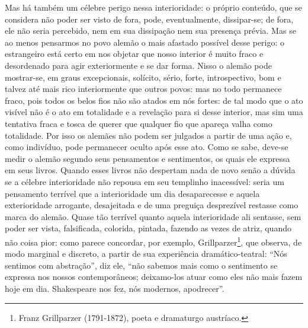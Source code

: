\begin{enumerate}
    Mas há também um célebre perigo nessa interioridade: o próprio
    conteúdo, que se considera não poder ser visto de fora, pode,
    eventualmente, dissipar-se; de fora, ele não seria percebido, nem em
    sua dissipação nem sua presença prévia. Mas se ao menos pensarmos no
    povo alemão o mais afastado possível desse perigo: o estrangeiro
    está certo em nos objetar que nosso interior é muito fraco e
    desordenado para agir exteriormente e se dar forma. Nisso o alemão
    pode mostrar-se, em graus excepcionais, solícito, sério, forte,
    introspectivo, bom e talvez até mais rico interiormente que outros
    povos: mas no todo permanece fraco, pois todos os belos fios não são
    atados em nós fortes: de tal modo que o ato visível não é o ato em
    totalidade e a revelação para si desse interior, mas sim uma
    tentativa fraca e tosca de querer que qualquer fio que apareça valha
    como totalidade. Por isso os alemães não podem ser julgados a partir
    de uma ação e, como indivíduo, pode permanecer oculto após esse ato.
    Como se sabe, deve-se medir o alemão segundo seus pensamentos e
    sentimentos, os quais ele expressa em seus livros. Quando esses
    livros não despertam nada de novo senão a dúvida se a célebre
    interioridade não repousa em seu templinho inacessível: seria um
    pensamento terrível que a interioridade um dia desaparecesse e
    aquela exterioridade arrogante, desajeitada e de uma preguiça
    desprezível restasse como marca do alemão. Quase tão terrível quanto
    aquela interioridade ali sentasse, sem poder ser vista, falsificada,
    colorida, pintada, fazendo as vezes de atriz, quando não coisa pior:
    como parece concordar, por exemplo, Grillparzer\footnote{Franz
      Grillparzer (1791-1872), poeta e dramaturgo austríaco.}, que
    observa, de modo marginal e discreto, a partir de sua experiência
    dramático-teatral: ``Nós sentimos com abstração'', diz ele, ``não
    sabemos mais como o sentimento se expressa nos nossos
    contemporâneos; deixamo-los atuar como eles não mais fazem hoje em
    dia. Shakespeare nos fez, nós modernos, apodrecer''.


\end{enumerate}
